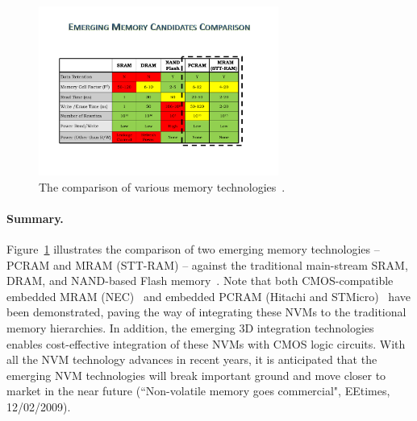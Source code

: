 \begin{figure}
\centering
\vspace{-10pt} \includegraphics[width=0.7\textwidth]{./figure/table.pdf} \vspace{-10pt}
\caption{The comparison of various memory
technologies~\cite{ITRS07}.}\label{table} \vspace{-10pt}
\end{figure}
\paragraph{Summary.} Figure~\ref{table} illustrates the comparison of
two emerging memory technologies -- PCRAM and MRAM (STT-RAM)  --
against the traditional main-stream SRAM, DRAM, and NAND-based Flash memory~\cite{ITRS07}.
Note that both CMOS-compatible embedded MRAM (NEC)~\cite{MRAM:NEC09} and embedded PCRAM (Hitachi and STMicro)~\cite{PRAM:Hitachi2007,PRAM:ST2004} have been demonstrated, paving the way of integrating
these NVMs to the traditional memory hierarchies. In addition, the emerging 3D integration technologies~\cite{xie:jetcs06,Xie:dac08}
enables cost-effective integration of these NVMs with CMOS logic circuits. With all the NVM technology advances in recent years, it is anticipated that the emerging NVM technologies will break important ground and move closer to market in the near future (``Non-volatile memory goes commercial", EEtimes, 12/02/2009).


